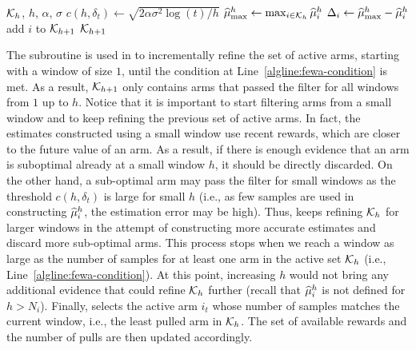 \begin{algorithm}[t]
\caption{{\FILTER}}
\label{alg:filter}
\begin{algorithmic}[1]
\Require $\mathcal{K}_{h}$, $h$, $\alpha$, $\sigma$
\State $c(h, \delta_t) \leftarrow \sqrt{2\alpha\sigma^2\log{(t)}/h }$
\State $\widehat{\mu}^h_{\max}  \leftarrow \max_{i \in \mathcal{K}_{h}}\widehat{\mu}_i^h$\label{algline:filter-max}
	\State $\Delta_i \leftarrow  \widehat{\mu}^h_{\max} - \widehat{\mu}^h_{i} $ \label{algline:filter-delta}
	\State add $i$ to $\mathcal{K}_{h+1}$ \label{algline:filter-add}
	\EndIf
\EndFor
\Ensure $\mathcal{K}_{h+1}$
\end{algorithmic}
\end{algorithm}



The \FILTER subroutine is used in \FEWA to incrementally refine the set of active arms, starting with a window of size $1$, until the condition at Line~\ref{algline:fewa-condition} is met. As a result, $\mathcal{K}_{h+1}$ only contains arms that passed the filter for all windows from $1$ up to $h$. Notice that it is important to start filtering arms from a small window and to keep refining the previous set of active arms. 
In fact, the estimates constructed using a small window use recent rewards, which are closer to the future value of an arm. As a result, if there is enough evidence that an arm is suboptimal already at a small window $h$, it should be directly discarded. On the other hand, a sub-optimal arm may pass the filter for small windows as the threshold $c(h , \delta_t)$ is large for small $h$ (i.e., as few samples are used in constructing $\widehat{\mu}_i^h$, the estimation error may be high). Thus, \FEWA keeps refining $\mathcal{K}_{h}$ for larger windows in the attempt of constructing more accurate estimates and discard more sub-optimal arms. This process stops when we reach a window as large as the number of samples for at least one arm in the active set $\mathcal{K}_{h}$ (i.e., Line~\ref{algline:fewa-condition}). At this point, increasing $h$ would not bring any additional evidence that could refine $\mathcal{K}_{h}$ further (recall that $\widehat{\mu}^h_i$ is not defined for $h > N_i$). Finally,  \FEWA selects the active arm $i_t$ whose number of samples matches the current window, i.e., the least pulled arm in $\mathcal{K}_{h}$. The set of available rewards and the number of pulls are then updated accordingly. 

